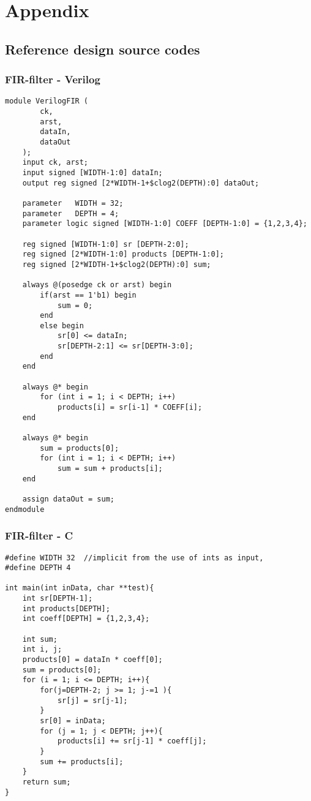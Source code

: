 \chapter{Appendix}
\section{\label{sec:sourcecode}Reference design source codes}

\subsection{FIR-filter - Verilog}
\lstset{language=Verilog, style=Verilogstyle}
\begin{lstlisting}[caption={FIR-filter implemented in Verilog},label=lst:firfilterverilog]
module VerilogFIR (
		ck,
		arst,
		dataIn,
		dataOut
	);
	input ck, arst;
	input signed [WIDTH-1:0] dataIn;
	output reg signed [2*WIDTH-1+$clog2(DEPTH):0] dataOut;
	
	parameter	WIDTH = 32;
	parameter	DEPTH = 4;
	parameter logic signed [WIDTH-1:0] COEFF [DEPTH-1:0] = {1,2,3,4};
	
	reg signed [WIDTH-1:0] sr [DEPTH-2:0];
	reg signed [2*WIDTH-1:0] products [DEPTH-1:0];
	reg signed [2*WIDTH-1+$clog2(DEPTH):0] sum;
	
	always @(posedge ck or arst) begin
		if(arst == 1'b1) begin
			sum = 0;
		end 
		else begin
			sr[0] <= dataIn;
			sr[DEPTH-2:1] <= sr[DEPTH-3:0];
		end
	end
	
	always @* begin
		for (int i = 1; i < DEPTH; i++)
			products[i] = sr[i-1] * COEFF[i];
	end
	
	always @* begin
		sum = products[0];
		for (int i = 1; i < DEPTH; i++)
			sum = sum + products[i];
	end
	
	assign dataOut = sum;
endmodule
\end{lstlisting}
\clearpage
\subsection{FIR-filter - C}
\lstset{language=C,style=Cstyle}
\begin{lstlisting}[caption={FIR-filter implemented in C},label=lst:firfilterc]
#define WIDTH 32  //implicit from the use of ints as input,
#define DEPTH 4

int main(int inData, char **test){
    int sr[DEPTH-1];
	int products[DEPTH];
    int coeff[DEPTH] = {1,2,3,4};

    int sum;
	int i, j;
	products[0] = dataIn * coeff[0];
	sum = products[0];
    for (i = 1; i <= DEPTH; i++){
		for(j=DEPTH-2; j >= 1; j-=1 ){
			sr[j] = sr[j-1];
		}
		sr[0] = inData;
		for (j = 1; j < DEPTH; j++){
			products[i] += sr[j-1] * coeff[j];
		}
        sum += products[i];
    }
    return sum;
}
\end{lstlisting}
\clearpage

